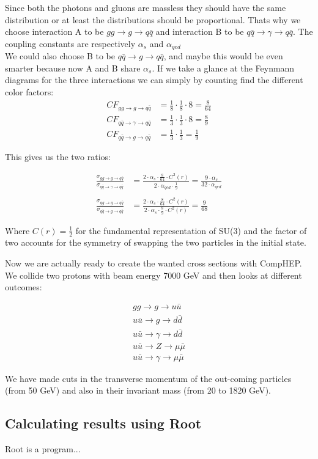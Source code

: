Since both the photons and gluons are massless they should have the same distribution or at least the distributions should be proportional. Thats why we choose interaction A to be $gg \rightarrow g \rightarrow q \bar q$ and interaction B to be $q \bar q \rightarrow \gamma \rightarrow q \bar q$. The coupling constants are respectively $\alpha_{s}$ and $\alpha_{qed}$\\


We could also choose B to be  $q \bar q \rightarrow g \rightarrow q \bar q$, and maybe this would be even smarter because now A and B share $\alpha_{s}$. If we take a glance at the Feynmann diagrams for the three interactions we can simply by counting find the different color factors:
\begin{align}
	CF_{gg \rightarrow g \rightarrow q \bar q}&=\frac{1}{8} \cdot \frac{1}{8} \cdot 8=\frac{8}{64}\\
	CF_{q \bar q \rightarrow \gamma \rightarrow q \bar q}&=\frac{1}{3} \cdot \frac{1}{3} \cdot 8=\frac{8}{9}\\
	CF_{q \bar q \rightarrow g \rightarrow q \bar q}&=\frac{1}{3} \cdot \frac{1}{3}=\frac{1}{9}
\end{align}

This gives us the two ratios:

\begin{align}
	\frac{\sigma_{gg \rightarrow g \rightarrow q \bar q}}{\sigma_{q \bar q \rightarrow \gamma \rightarrow q \bar q}} &=\frac{2 \cdot \alpha_{s} \cdot \frac{8}{64} \cdot C^{2}(r)}{2 \cdot \alpha_{qed} \cdot \frac{1}{9}}=\frac{9 \cdot  \alpha_{s} }{32 \cdot  \alpha_{qed} }\\ \nonumber \\
	\frac{\sigma_{gg \rightarrow g \rightarrow q \bar q}}{\sigma_{q \bar q \rightarrow g \rightarrow q \bar q}} &=\frac{2 \cdot \alpha_{s} \cdot \frac{8}{64} \cdot C^{2}(r)}{2 \cdot \alpha_{s} \cdot \frac{8}{9} \cdot C^{2}(r)}=\frac{9}{68}
\end{align}

Where $C(r) = \frac{1}{2}$ for the fundamental representation of SU(3) and the factor of two accounts for the symmetry of swapping the two particles in the initial state.

Now we are actually ready to create the wanted cross sections with CompHEP. We collide two protons with beam energy 7000 GeV and then looks at different outcomes:

\begin{align}
gg \rightarrow g \rightarrow u \bar u \nonumber \\ \nonumber
u \bar u \rightarrow g \rightarrow d \bar d \\ \nonumber
u \bar u \rightarrow \gamma \rightarrow d \bar d \\ \nonumber
u \bar u \rightarrow Z \rightarrow \mu \bar \mu \\ \nonumber
u \bar u \rightarrow \gamma \rightarrow \mu \bar \mu 
\end{align}

We have made cuts in the transverse momentum of the out-coming particles (from 50 GeV) and also in their invariant mass (from 20 to 1820 GeV). 

\subsection{Calculating results using Root}
Root is a program...

